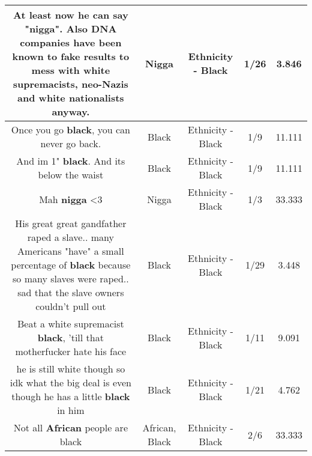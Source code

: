 \documentclass[11pt]{article}
\newlength\mylength
\begin{document}
\begin{center}
\begin{longtable}{|C{.65\mylength}|C{.30\mylength}|C{.12\mylength}|C{.12\mylength}|C{.12\mylength}|}
  \small At least now he can say "\textbf{nigga}". Also DNA companies have been known to fake results to mess with white supremacists, neo-Nazis and white nationalists anyway.\normalsize   & Nigga & Ethnicity - Black & 1/26 & 3.846 \\  \hline
  \small Once you go \textbf{black}, you can never go back.\normalsize   & Black & Ethnicity - Black & 1/9 & 11.111 \\  \hline
  \small And im 1" \textbf{black}. And its below the waist\normalsize   & Black & Ethnicity - Black & 1/9 & 11.111 \\  \hline
  \small Mah \textbf{nigga} <3\normalsize   & Nigga & Ethnicity - Black & 1/3 & 33.333 \\  \hline
  \small His great great gandfather raped a slave.. many Americans "have" a small percentage of \textbf{black} because so many slaves were raped.. sad that the slave owners couldn't pull out\normalsize   & Black & Ethnicity - Black & 1/29 & 3.448 \\  \hline
  \small Beat a white supremacist \textbf{black}, 'till that motherfucker hate his face\normalsize   & Black & Ethnicity - Black & 1/11 & 9.091 \\  \hline
  \small he is still white though so idk what the big deal is even though he has a little \textbf{black} in him\normalsize   & Black & Ethnicity - Black & 1/21 & 4.762 \\  \hline
  \small Not all \textbf{African} people are black\normalsize   & African, Black & Ethnicity - Black & 2/6 & 33.333 \\  \hline

\end{longtable}
\end{center}
\end{document}
